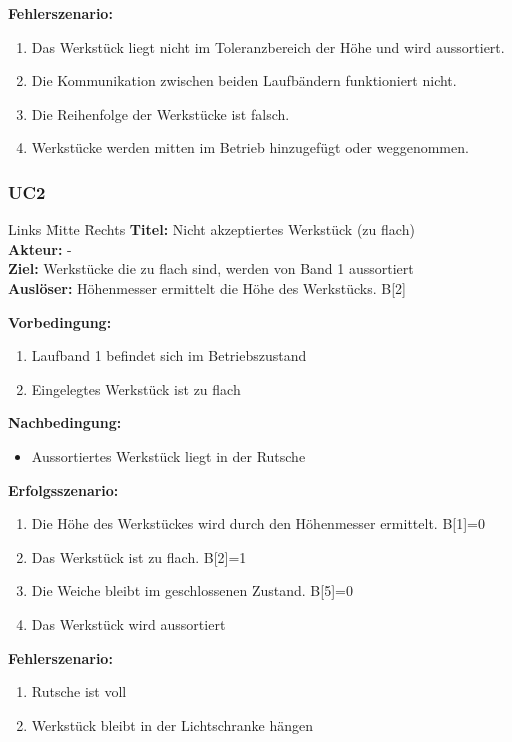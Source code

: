 \documentclass[oneside,a4paper,titlepage]{scrartcl} %
\begin{document}
\newpage
\textbf{Fehlerszenario:}
\begin{enumerate}
 \item Das Werkstück liegt nicht im Toleranzbereich der Höhe und wird aussortiert.
 \item Die Kommunikation zwischen beiden Laufbändern funktioniert nicht.
 \item Die Reihenfolge der Werkstücke ist falsch.
 \item Werkstücke werden mitten im Betrieb hinzugefügt oder weggenommen.
\end{enumerate}

\subsubsection{UC2}
\begin{tabbing}
 Links \= Mitte \= Rechts \kill
 \textbf{Titel:} \> \> Nicht akzeptiertes Werkstück (zu flach)\\
 \textbf{Akteur:} \> \> -\\
 \textbf{Ziel:} \> \> Werkstücke die zu flach sind, werden von Band 1 aussortiert\\
 \textbf{Auslöser:} \> \> Höhenmesser ermittelt die Höhe des Werkstücks. B[2]\\
\end{tabbing}
\textbf{Vorbedingung:}
\begin{enumerate}
 \item Laufband 1 befindet sich im Betriebszustand
 \item Eingelegtes Werkstück ist zu flach
\end{enumerate}
\textbf{Nachbedingung:}
\begin{itemize}
 \item Aussortiertes Werkstück liegt in der Rutsche
\end{itemize}
\textbf{Erfolgsszenario:}
\begin{enumerate}
 \item Die Höhe des Werkstückes wird durch den Höhenmesser ermittelt. B[1]=0
 \item Das Werkstück ist zu flach. B[2]=1
 \item Die Weiche bleibt im geschlossenen Zustand. B[5]=0
 \item Das Werkstück wird aussortiert
\end{enumerate}
\textbf{Fehlerszenario:}
\begin{enumerate}
 \item Rutsche ist voll
 \item Werkstück bleibt in der Lichtschranke hängen
\end{enumerate}
\end{document}
